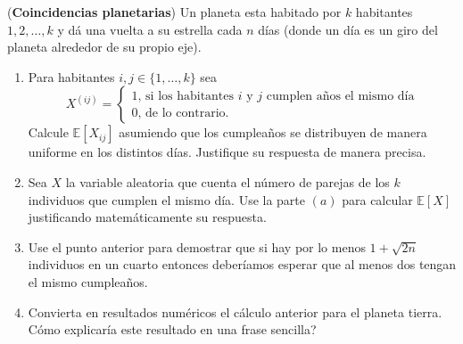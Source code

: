 \documentclass[12pt, a4paper]{article}
\newcommand{\EE}{\mathbb{E}}
\begin{document}

\item ({\bf Coincidencias planetarias}) Un planeta esta habitado por $k$ habitantes $1,2,\dots, k$ y dá una vuelta a su estrella cada $n$ días (donde un día es un giro del planeta alrededor de su propio eje).
\begin{enumerate}
\item Para habitantes $i,j\in \{1,\dots, k\}$ sea 
\[X^{(ij)}=\begin{cases}
1\text{, si los habitantes $i$ y $j$ cumplen años el mismo día}\\
0\text{, de lo contrario.}
\end{cases}
\]
Calcule $\EE[X_{ij}]$ asumiendo que los cumpleaños se distribuyen de manera uniforme en los distintos días. Justifique su respuesta de manera precisa.
\item Sea $X$ la variable aleatoria que cuenta el número de parejas de los $k$ individuos que cumplen el mismo día. Use la parte $(a)$ para calcular $\EE[X]$ justificando matemáticamente su respuesta.
\item Use el punto anterior para demostrar que si hay por lo menos $1+\sqrt{2n}$ individuos en un cuarto entonces deberíamos esperar que al menos dos tengan el mismo cumpleaños.
\item Convierta en resultados numéricos el cálculo anterior para el planeta tierra. Cómo explicaría este resultado en una frase sencilla?
\end{enumerate}
\end{document}
